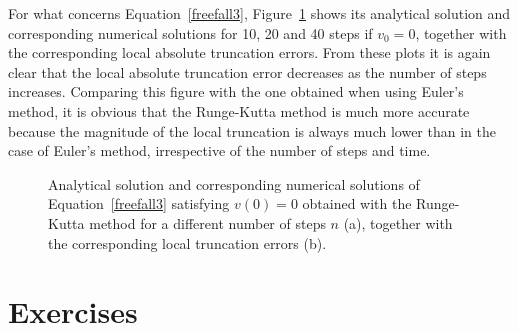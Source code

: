 \begin{example}
For what concerns Equation~\eqref{freefall3}, Figure~\ref{etRK4} shows its analytical solution and corresponding numerical solutions for 10, 20 and 40 steps if $v_0=0$, together with the corresponding local absolute truncation errors. From these plots it is again clear that the local absolute truncation error decreases as the number of steps increases. Comparing this figure with the one obtained when using Euler's method, it is obvious that the Runge-Kutta method is much more accurate because the magnitude of the local truncation is always much lower than in the case of Euler's method, irrespective of the number of steps and time. 

\begin{figure}[H]
\centering
\centerline{
\hspace{1cm}
}
\caption{Analytical solution and corresponding numerical solutions of Equation~\eqref{freefall3} satisfying $v(0)=0$ obtained with the Runge-Kutta method for a different number of steps $n$ (a), together with the corresponding local truncation errors (b).}
\label{etRK4}
\end{figure}

\end{example}

\newpage
\section{Exercises}
\renewcommand{\ExerciseListName}{Assignement}

